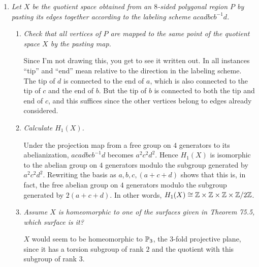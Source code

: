 \documentclass[10pt]{article}
\begin{document}
\begin{enumerate}
\item \emph{Let $X$ be the quotient space obtained from an $8$-sided polygonal region $P$ by pasting its edges together according to the labeling scheme $acadbcb^{-1}d$.}

\begin{enumerate}
\item \emph{Check that all vertices of $P$ are mapped to the same point of the quotient space $X$ by the pasting map.}

Since I'm not drawing this, you get to see it written out.  In all instances ``tip'' and ``end'' mean relative to the direction in the labeling scheme.  The tip of $d$ is connected to the end of $a$, which is also connected to the tip of $c$ and the end of $b$.  But the tip of $b$ is connected to both the tip and end of $c$, and this suffices since the other vertices belong to edges already considered.


\item \emph{Calculate $H_1(X)$.}

Under the projection map from a free group on $4$ generators to its abelianization, $acadbcb^{-1}d$ becomes $a^2c^2d^2$.  Hence $H_1(X)$ is isomorphic to the abelian group on $4$ generators modulo the subgroup generated by $a^2c^2d^2$.  Rewriting the basis as $a,b,c,(a+c+d)$ shows that this is, in fact, the free abelian group on $4$ generators modulo the subgroup generated by $2(a+c+d)$.  In other words, $H_1(X) \iso \Z \times \Z \times \Z \times \Z/2\Z$.
\item \emph{Assume $X$ is homeomorphic to one of the surfaces given in Theorem 75.5, which surface is it?}

$X$ would seem to be homeomorphic to $\P_3$, the $3$-fold projective plane, since it has a torsion subgroup of rank $2$ and the quotient with this subgroup of rank $3$.

\end{enumerate}

\end{enumerate}
\end{document}
